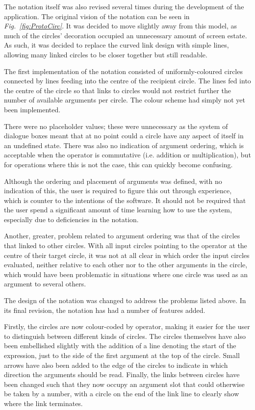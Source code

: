 \documentclass[12pt,twoside,notitlepage,xetex]{report}
\begin{document}
The notation itself was also revised several times during the development of the application.  The original vision of the notation can be seen in \emph{Fig.~\ref{fig:ProtoCirc}}.  It was decided to move slightly away from this model, as much of the circles' decoration occupied an unnecessary amount of screen estate. As such, it was decided to replace the curved link design with simple lines, allowing many linked circles to be closer together but still readable.

The first implementation of the notation consisted of uniformly-coloured circles connected by lines feeding into the centre of the recipient circle.  The lines fed into the centre of the circle so that links to circles would not restrict further the number of available arguments per circle.  The colour scheme had simply not yet been implemented.

There were no placeholder values; these were unnecessary as the system of dialogue boxes meant that at no point could a circle have any
aspect of itself in an undefined state.  There was also no indication of argument ordering, which is acceptable when the operator is commutative (i.e. addition or multiplication), but for operations where this is not the case, this can quickly become confusing.

Although the ordering and placement of arguments was defined, with no indication of this, the user is required to figure this out through experience, which is counter to the intentions of the software.  It should not be required that the user spend a significant amount of time learning how to use the system, especially due to deficiencies in the notation.

Another, greater, problem related to argument ordering was that of the circles that linked to other circles.  With all input circles pointing to the operator at the centre of their target circle, it was not at all clear in which order the input circles evaluated, neither relative to each other nor to the other arguments in the circle, which would have been problematic in situations where one circle was used as an argument to several others.

The design of the notation was changed to address the problems listed above.  In its final revision, the notation has had a number of features added.

Firstly, the circles are now colour-coded by operator, making it easier for the user to distinguish between different kinds of circles.  The circles themselves have also been embellished slightly with the addition of a line denoting the start of the expression, just to the side of the first argument at the top of the circle.  Small arrows have also been added to the edge of the circles to indicate in which direction the arguments should be read.  Finally, the links between circles have been changed such that they now occupy an argument slot that could otherwise be taken by a number, with a circle on the end of the link line to clearly show where the link terminates.
\end{document}
